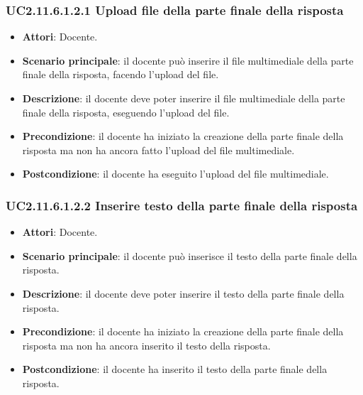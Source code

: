 \subsubsection{UC2.11.6.1.2.1 Upload file della parte finale della risposta}
\begin{itemize}
\item \textbf{Attori}: Docente.
\item \textbf{Scenario principale}: il docente può inserire il file multimediale della parte finale della risposta, facendo l'upload del file.
\item \textbf{Descrizione}: il docente deve poter inserire il file multimediale della parte finale della risposta, eseguendo l'upload del file.
\item \textbf{Precondizione}: il docente ha iniziato la creazione della parte finale della risposta ma non ha ancora fatto l'upload del file multimediale.
\item \textbf{Postcondizione}: il docente ha eseguito l'upload del file multimediale.
\end{itemize}
\subsubsection{UC2.11.6.1.2.2 Inserire testo della parte finale della risposta}
\begin{itemize}
\item \textbf{Attori}: Docente.
\item \textbf{Scenario principale}: il docente può inserisce il testo della parte finale della risposta.
\item \textbf{Descrizione}: il docente deve poter inserire il testo della parte finale della risposta.
\item \textbf{Precondizione}: il docente ha iniziato la creazione della parte finale della risposta ma non ha ancora inserito il testo della risposta.
\item \textbf{Postcondizione}: il docente ha inserito il testo della parte finale della risposta.
\end{itemize}
